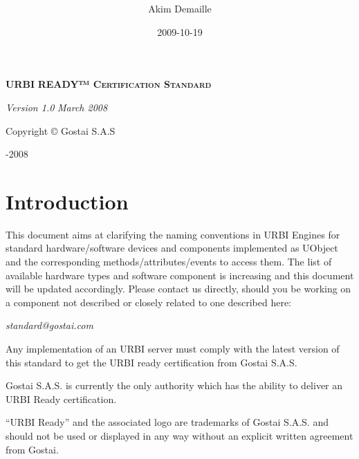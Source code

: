 \documentclass[a4paper]{article}
\title{ }
\author{Akim Demaille}
\date{2009-10-19}
\begin{document}
{\centering
\par}

{\centering
\textsf{\textbf{\textsc{URBI }}}\textsf{\textbf{\textsc{READY™
Certification Standard}}}
\par}

{\centering
\par}

{\centering
\textsf{\textit{Version 1.0}}  \textsf{\textit{March 2008}}
\par}

{\centering\sffamily
Copyright © Gostai S.A.S
\par}

{\centering{}-2008
\par}

\setcounter{tocdepth}{3}
\renewcommand\contentsname{}
\tableofcontents
\section[]{}
\section[Introduction]{Introduction}
{
\textsf{This document aims at clarifying the naming convention}\textsf{s
in URBI Engines for standard hardware/software devices and components
implemented as }UObject\textsf{ and the corresponding
methods/attributes/events to access them. The list of available
hardware types and software component is increasing and this document
will be updated accordingly. Please contact us directly, should you be
working on a component not described or closely related to one
described here:}}

{\centering\sffamily\itshape
standard@gostai.com
\par}


Any implementation of an URBI server must comply with the latest version
of this standard to get the {\textquotedbl}URBI ready{\textquotedbl}
certification from Gostai S.A.S.


Gostai S.A.S. is currently the only authority which has the ability to
deliver an {\textquotedbl}URBI Ready{\textquotedbl} certification.

{
“URBI Ready” and the associated logo are trademarks of Gostai S.A.S. and
should not be used or displayed in any way without an explicit written
agreement from Gostai.}
\end{document}
